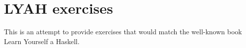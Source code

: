 
\chapter{LYAH exercises}
\label{chap:lyah}

This is an attempt to provide exercises that would match the well-known book
Learn Yourself a Haskell.

